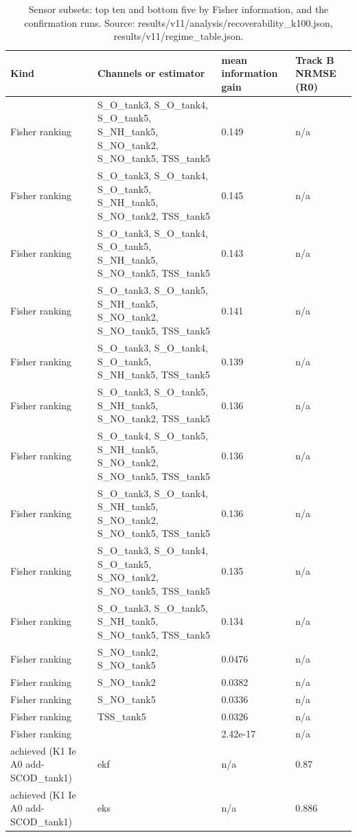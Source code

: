 \begin{table}[t]
\centering
\caption{Sensor subsets: top ten and bottom five by Fisher information, and the confirmation runs. Source: results/v11/analysis/recoverability\_k100.json, results/v11/regime\_table.json.}
\label{tab:si-sensors}
\footnotesize
\begin{tabular}{llll}
\toprule
Kind & Channels or estimator & mean information gain & Track B NRMSE (R0) \\
\midrule
Fisher ranking & S\_O\_tank3, S\_O\_tank4, S\_O\_tank5, S\_NH\_tank5, S\_NO\_tank2, S\_NO\_tank5, TSS\_tank5 & 0.149 & n/a \\
Fisher ranking & S\_O\_tank3, S\_O\_tank4, S\_O\_tank5, S\_NH\_tank5, S\_NO\_tank2, TSS\_tank5 & 0.145 & n/a \\
Fisher ranking & S\_O\_tank3, S\_O\_tank4, S\_O\_tank5, S\_NH\_tank5, S\_NO\_tank5, TSS\_tank5 & 0.143 & n/a \\
Fisher ranking & S\_O\_tank3, S\_O\_tank5, S\_NH\_tank5, S\_NO\_tank2, S\_NO\_tank5, TSS\_tank5 & 0.141 & n/a \\
Fisher ranking & S\_O\_tank3, S\_O\_tank4, S\_O\_tank5, S\_NH\_tank5, TSS\_tank5 & 0.139 & n/a \\
Fisher ranking & S\_O\_tank3, S\_O\_tank5, S\_NH\_tank5, S\_NO\_tank2, TSS\_tank5 & 0.136 & n/a \\
Fisher ranking & S\_O\_tank4, S\_O\_tank5, S\_NH\_tank5, S\_NO\_tank2, S\_NO\_tank5, TSS\_tank5 & 0.136 & n/a \\
Fisher ranking & S\_O\_tank3, S\_O\_tank4, S\_NH\_tank5, S\_NO\_tank2, S\_NO\_tank5, TSS\_tank5 & 0.136 & n/a \\
Fisher ranking & S\_O\_tank3, S\_O\_tank4, S\_O\_tank5, S\_NO\_tank2, S\_NO\_tank5, TSS\_tank5 & 0.135 & n/a \\
Fisher ranking & S\_O\_tank3, S\_O\_tank5, S\_NH\_tank5, S\_NO\_tank5, TSS\_tank5 & 0.134 & n/a \\
Fisher ranking & S\_NO\_tank2, S\_NO\_tank5 & 0.0476 & n/a \\
Fisher ranking & S\_NO\_tank2 & 0.0382 & n/a \\
Fisher ranking & S\_NO\_tank5 & 0.0336 & n/a \\
Fisher ranking & TSS\_tank5 & 0.0326 & n/a \\
Fisher ranking &  & 2.42e-17 & n/a \\
achieved (K1 Ie A0 add-SCOD\_tank1) & ekf & n/a & 0.87 \\
achieved (K1 Ie A0 add-SCOD\_tank1) & eks & n/a & 0.886 \\

\end{tabular}
\end{table}
